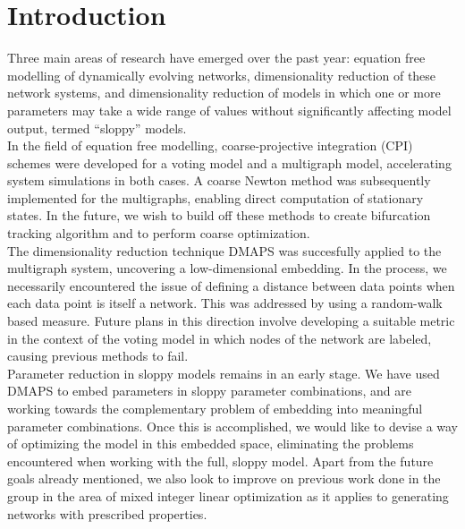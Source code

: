\documentclass[12pt]{article}
\begin{document}
\section{Introduction}
  Three main areas of research have emerged over the past year: equation free modelling of dynamically evolving networks, dimensionality reduction of these network systems, and dimensionality reduction of models in which one or more parameters may take a wide range of values without significantly affecting model output, termed ``sloppy'' models. \\
  In the field of equation free modelling, coarse-projective integration (CPI) schemes were developed for a voting model and a multigraph model, accelerating system simulations in both cases. A coarse Newton method was subsequently implemented for the multigraphs, enabling direct computation of stationary states. In the future, we wish to build off these methods to create bifurcation tracking algorithm and to perform coarse optimization. \\
  The dimensionality reduction technique DMAPS was succesfully applied to the multigraph system, uncovering a low-dimensional embedding. In the process, we necessarily encountered the issue of defining a distance between data points when each data point is itself a network. This was addressed by using a random-walk based measure. Future plans in this direction involve developing a suitable metric in the context of the voting model in which nodes of the network are labeled, causing previous methods to fail. \\
  Parameter reduction in sloppy models remains in an early stage. We have used DMAPS to embed parameters in sloppy parameter combinations, and are working towards the complementary problem of embedding into meaningful parameter combinations. Once this is accomplished, we would like to devise a way of optimizing the model in this embedded space, eliminating the problems encountered when working with the full, sloppy model.
  Apart from the future goals already mentioned, we also look to improve on previous work done in the group in the area of mixed integer linear optimization as it applies to generating networks with prescribed properties.

\section{}
\end{document}
